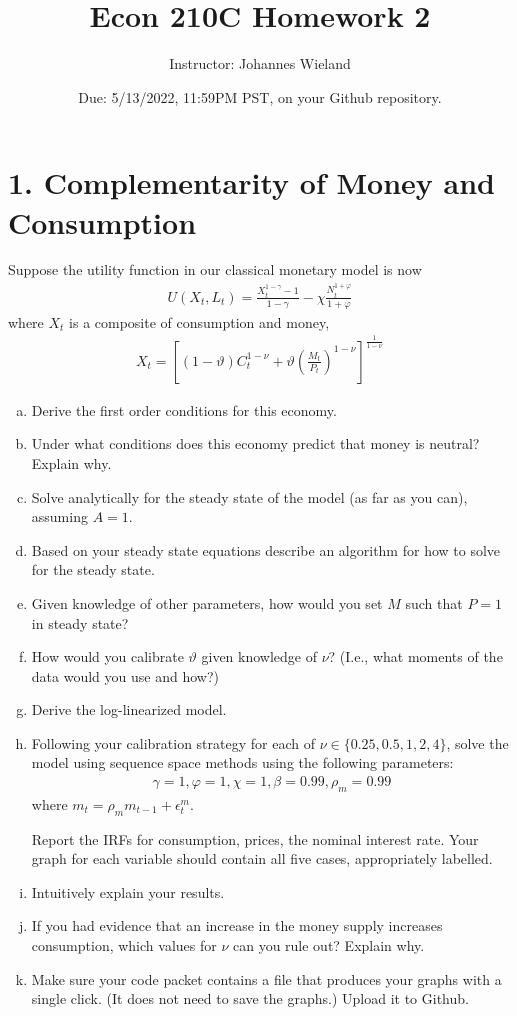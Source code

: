 \documentclass{article}
\newcommand{\1}{\mathbf{1}}
\begin{document}
\title{Econ 210C Homework 2}
\author{Instructor: Johannes Wieland}
\date{\color{red} Due: 5/13/2022, 11:59PM PST, on your Github repository.}
\maketitle




\section*{1. Complementarity of Money and Consumption}
Suppose the utility function in our classical monetary model is now
\begin{align*}
	U(X_t,L_t)=\frac{X_t^{1-\gamma}-1}{1-\gamma}-\chi \frac{N_t^{1+\varphi}}{{1+\varphi}}
\end{align*}
where $X_t$ is a composite of consumption and money,
\begin{align*}
	X_t=\left[(1-\vartheta)C_t^{1-\nu}+\vartheta\left(\frac{M_t}{P_t}\right)^{1-\nu}\right]^{\frac{1}{1-\nu}}
\end{align*}
\begin{enumerate}[(a)]
	\item Derive the first order conditions for this economy.
	\item Under what conditions does this economy predict that money is neutral? Explain why.
	\item Solve analytically for the steady state of the model (as far as you can), assuming $A=1$.
	\item Based on your steady state equations describe an algorithm for how to solve for the steady state.
	\item Given knowledge of other parameters, how would you set $M$ such that $P=1$ in steady state?
	\item How would you calibrate $\vartheta$ given knowledge of $\nu$? (I.e., what moments of the data would you use and how?)
	\item Derive the log-linearized model. 
	\item Following your calibration strategy for each of $\nu\in\{0.25,0.5,1,2,4\}$, solve the model using sequence space methods using the following parameters:
	\begin{align*} \gamma=1,\varphi=1,\chi=1,\beta=0.99,\rho_m=0.99
	\end{align*}
	where $m_t = \rho_m m_{t-1} + \epsilon_t^m$.
	
	Report the IRFs for consumption, prices, the nominal interest rate. Your graph for each variable should contain all five cases, appropriately labelled. 
	\item Intuitively explain your results.
	\item If you had evidence that an increase in the money supply increases consumption, which values for $\nu$ can you rule out? Explain why.
	\item Make sure your code packet contains a file that produces your graphs with a single click. (It does not need to save the graphs.) Upload it to Github.
\end{enumerate}
\end{document}
